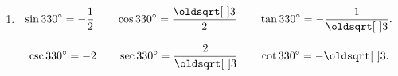 \documentclass[12pt]{article} %
\begin{document}
\begin{qstn}
\begin{solution}
\begin{enumerate}[label=(\alph*)]
    \item 
      \[
          \sin 330^{\circ} = -\frac{1}{2} \hspace{0.7cm} \cos 330^{\circ} = \frac{\sqrt{3}}{2}\hspace{0.7cm} 
          \tan 330^{\circ} = -\frac{1}{\sqrt{3}}.  
      \] 

      \[
          \csc 330^{\circ} = -2 \hspace{0.7cm} \sec 330^{\circ} =  \frac{2}{\sqrt{3}}  \hspace{0.7cm} 
          \cot 330^{\circ} = -\sqrt{3} .  
      \] 


      \end{enumerate}
      
    \end{solution}

  \end{qstn}
\end{document}
